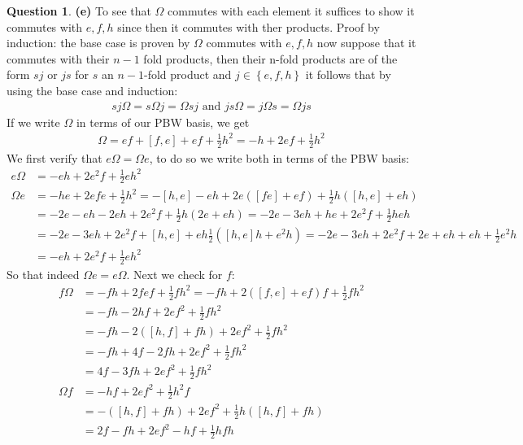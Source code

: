 \documentclass[10.5pt]{article}
\theoremstyle{definition}
\newtheorem{pb}{Question}
\numberwithin{example}{subsection}
\numberwithin{proposition}{subsection}
\newcommand{\set}[1]{\left\{#1\right\}}
\newcommand{\tand}{\text{ and }}
\begin{document}
\begin{pb}
        \textbf{(e)} To see that \(\Omega\) commutes with each element it suffices to show it commutes with \(e,f,h\) since then it commutes with ther products. Proof by induction: the base case is proven by \(\Omega\) commutes with \(e,f,h\) now suppose that it commutes with their \(n-1\) fold products, then their n-fold products are of the form \(sj\) or \(js\) for \(s\) an \(n-1\)-fold product and \(j \in \set{e,f,h}\) it follows that by using the base case and induction:
        \begin{align}
            sj\Omega = s\Omega j = \Omega sj \tand js \Omega = j\Omega s = \Omega js
        \end{align}
        If we write \(\Omega\) in terms of our PBW basis, we get
        \begin{align}
            \Omega = ef + [f,e] + ef + \frac12 h^2 = -h + 2ef + \frac12 h^2
        \end{align}
        We first verify that \(e\Omega = \Omega e\), to do so we write both in terms of the PBW basis:
        \begin{align}
            e\Omega &= -eh + 2e^2f + \frac12 eh^2 \\
            \Omega e &= -he + 2efe + \frac12 h^2 = -[h,e] - eh + 2e([fe] + ef) + \frac12h([h,e]+eh) \\ &= -2e - eh - 2eh + 2e^2f + \frac12 h(2e + eh) = -2e - 3eh + he + 2e^2f + \frac12 heh \\
            &= -2e -3eh + 2e^2f + [h,e] + eh  \frac12([h,e]h + e^2h) = -2e -3eh + 2e^2f + 2e + eh + eh + \frac12 e^2h \\
            &= -eh + 2e^2f + \frac12eh^2
        \end{align}
        So that indeed \(\Omega e = e \Omega\). Next we check for \(f\):
        \begin{align}
            f\Omega &= -fh + 2fef + \frac12 fh^2 =-fh + 2([f,e] + ef)f + \frac12fh^2 \\
            &=-fh -2hf + 2ef^2 + \frac12 fh^2 \\
            &=-fh -2 ([h,f] + fh) + 2ef^2 + \frac12fh^2 \\
            &= -fh + 4f - 2fh + 2ef^2 + \frac12 fh^2 \\
            &= 4f - 3fh + 2ef^2 + \frac12fh^2 \\
            \Omega f &= -hf + 2ef^2 + \frac12h^2f \\
            &= -([h,f] + fh) + 2ef^2 + \frac12h([h,f] + fh) \\
            &= 2f - fh + 2ef^2 - hf + \frac12hfh \\

\end{align}
\end{pb}
\end{document}
